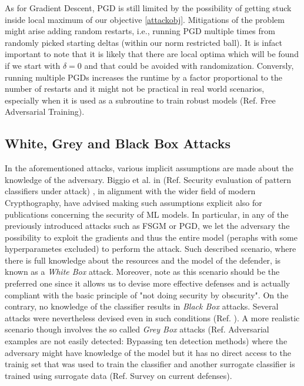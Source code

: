 \documentclass[LaM,binding=0.6cm]{./packages/sapthesis/sapthesis}
\begin{document}
        As for Gradient Descent, PGD is still limited by the possibility of getting stuck inside local maximum of our objective \ref{attackobj}.
        Mitigations of the problem might arise adding random restarts, i.e., running PGD multiple times from randomly picked starting deltas (within our norm restricted ball).
        It is infact important to note that it is likely that there are local optima which will be found if we start with $\delta = 0$ and that could be avoided with randomization. 
        Conversly, running multiple PGDs increases the runtime by a factor proportional to the number of restarts and it might not be practical in real world scenarios, especially when it is used
        as a subroutine to train robust models (Ref. Free Adversarial Training).

    \subsection{White, Grey and Black Box Attacks}

        In the aforementioned attacks, various implicit assumptions are made about the knowledge of the adversary. Biggio et al. in (Ref. Security evaluation of pattern classifiers under attack)
        , in alignment with the wider field of modern Crypthography, have advised making such assumptions explicit also for publications concerning the security of ML models. In particular,
        in any of the previously introduced attacks such as FSGM or PGD, we let the adversary the possibility to exploit the gradients and thus the entire model (peraphs with some hyperparametes excluded) 
        to perform the attack. Such described scenario, where there is full knowledge about the resources and the model of the defender, is known as a \textit{White Box} attack. 
        Moreover, note as this scenario should be the preferred one since it allows us to devise more effective defenses and is actually compliant with the basic principle
        of "not doing security by obscurity".    
        On the contrary, no knowledge of the classifier results in \textit{Black Box} attacks. Several attacks were nevertheless devised even in such conditions (Ref. ). A more realistic 
        scenario though involves the so called \textit{Grey Box} attacks (Ref. Adversarial examples are not easily detected: Bypassing ten detection methods)
        where the adversary might have knowledge of the model but it has no direct access to the trainig set that
        was used to train the classifier and another surrogate classifier is trained using surrogate data (Ref. Survey on current defenses).
\end{document}
